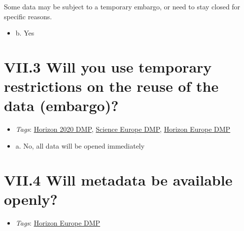 \documentclass[a4paper,12pt]{report}
\begin{document}
\noindent
\begin{markdown}
Some data may be subject to a temporary embargo, or need to stay closed for specific reasons. 
\end{markdown}



\begin{itemize}
  \item[\CheckmarkBold] b. Yes
\end{itemize}






\section*{\protect\textcolor{colorSecId}{VII.3} Will you use temporary restrictions on the reuse of the data (embargo)?}

\label{6be88f7c-f868-460f-bba7-91e1c659adfd.f5c12fcf-15d0-44ba-a53c-49ea9d7f620f}


\begin{itemize}
  \item \textit{Tags}: \ul{Horizon 2020 DMP}, \ul{Science Europe DMP}, \ul{Horizon Europe DMP}
  \end{itemize}




\begin{itemize}
  \item[\CheckmarkBold] a. No, all data will be opened immediately
\end{itemize}






\section*{\protect\textcolor{colorSecId}{VII.4} Will metadata be available openly?}

\label{6be88f7c-f868-460f-bba7-91e1c659adfd.12baa8af-db59-43a5-8ec7-0941c58ff89a}


\begin{itemize}
  \item \textit{Tags}: \ul{Horizon Europe DMP}
  \end{itemize}
\end{document}
